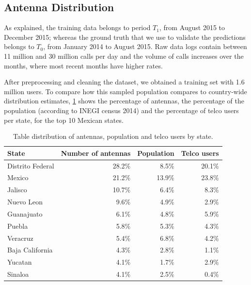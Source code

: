
\subsection{Antenna Distribution}\label{subsection:antenna_distribution}

As explained, the training data belongs to period $T_1$, from August 2015 to December 2015;
whereas the ground truth that we use to validate the predictions belongs to $T_0$, from January 2014 to August 2015. Raw data logs contain between 11 million and 30 million calls per day and the volume of calls increases over the months, where most recent months have higher rates.

After preprocessing and cleaning the dataset, we obtained
a training set with 1.6 million users.
To compare how this sampled population compares to country-wide distribution estimates,
\cref{tab:distribution_by_state} shows the percentage of antennas, the percentage of the population (according to INEGI census 2014) and
the percentage of telco users per state, for the top 10 Mexican states.


\begin{table}[ht]
	\caption{Table distribution of antennas, population and telco users by state.}\label{tab:distribution_by_state}
	\centering
	\begin{tabular}{l r r r}
		\toprule
		State				& Number of antennas & Population 	& Telco users \\
		\midrule
		Distrito Federal      & 28.2\% 	& 8.5\%		& 20.1\%   \\
		Mexico                     & 21.2\%		&   13.9\% 	& 23.8\%   \\
		Jalisco                   & 10.7\% 	& 6.4\%		& 8.3\%    \\
		Nuevo Leon               & 9.6\%	& 4.9\%		& 2.9\% \\
		Guanajuato               & 6.1\%	& 4.8\%		& 5.9\% \\
		Puebla                     & 5.8\%	& 5.3\%		& 4.3\% \\
		Veracruz                  & 5.4\% 	& 6.8\%		& 4.2\% \\
		Baja California       & 4.3\%	& 2.8\%		& 1.1\% \\
		Yucatan                   & 4.1\%	& 1.7\%		& 2.9\% \\
		Sinaloa                   & 4.1\%	& 2.5\%		& 0.4\% \\
		\bottomrule
	\end{tabular}
\end{table}

